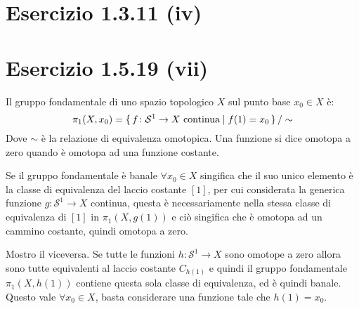 \documentclass[10pt]{scrartcl}
\newcommand{\Sph}[1][]{\mathcal{S}^#1}
\begin{document}
\section*{Esercizio 1.3.11 (iv)}


\section*{Esercizio 1.5.19 (vii)}
Il gruppo fondamentale di uno spazio topologico $ X $ sul punto base $ x_0 \in X $
è:
\[
  \pi_1(X,x_0) = \set{ f \colon \Sph{1} \to X \text{ continua} | f(1) = x_0 } \slash \sim
\]
Dove $ \sim $ è la relazione di equivalenza omotopica. Una funzione si dice
omotopa a zero quando è omotopa ad una funzione costante.

Se il gruppo fondamentale è banale $ \forall x_0 \in X $ singifica che il suo unico elemento
è la classe di equivalenza del laccio costante $ [1] $, per cui considerata
la generica funzione $ g \colon \Sph{1} \to X $ continua, questa è necessariamente
nella stessa classe di equivalenza di $ [1] $ in $ \pi_1(X, g(1)) $ e ciò singifica
che è omotopa ad un cammino costante, quindi omotopa a zero.

Mostro il viceversa. Se tutte le funzioni $ h \colon \Sph{1} \to X $ sono omotope a zero
allora sono tutte equivalenti al laccio costante $ C_{h(1)} $ e quindi il gruppo
fondamentale $ \pi_1(X, h(1)) $ contiene questa sola classe di equivalenza, ed è
quindi banale. Questo vale $ \forall x_0 \in X $, basta considerare una funzione tale
che $ h(1) = x_0 $.
\end{document}
